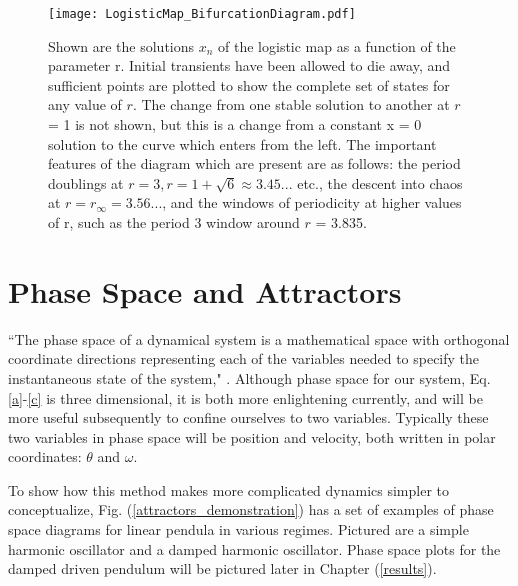 \documentclass[12pt,twoside]{reedthesis}
\begin{document}
\begin{figure}[h]
\centering
\texttt{[image: LogisticMap\_BifurcationDiagram.pdf]} 
\caption{Shown are the solutions $x_n$ of the logistic map as a function of the parameter r.  Initial transients have been allowed to die away, and sufficient points are plotted to show the complete set of states for any value of $r$.  The change from one stable solution to another at $r$ = 1 is not shown, but this is a change from a constant x = 0 solution to the curve which enters from the left.   The important features of the diagram which are present are as follows: the period doublings at $r= 3, r=1+\sqrt{6} \approx 3.45...$ etc., the descent into chaos at $r = r_\infty = 3.56...$, and the windows of periodicity at higher values of r, such as the period 3 window around $r$ = 3.835.}  %
\label{LogisticMap_BifurcationDiagram}
\end{figure}





\section{Phase Space and Attractors}


``The phase space of a dynamical system is a mathematical space with orthogonal coordinate directions representing each of the variables needed to specify the instantaneous state of the system," \cite{bakergollub1996}.  Although phase space for our system, Eq. \eqref{a}-\eqref{c} is three dimensional, it is both more enlightening currently, and will be more useful subsequently to confine ourselves to two variables.  Typically these two variables in phase space will be position and velocity, both written in polar coordinates: $\theta$ and $\omega$.  

To show how this method makes more complicated dynamics simpler to conceptualize, Fig. (\ref{attractors_demonstration}) has a set of examples of phase space diagrams for linear pendula in various regimes.  Pictured are a simple harmonic oscillator and a damped harmonic oscillator.  Phase space plots for the damped driven pendulum will be pictured later in Chapter (\ref{results}).
\end{document}
